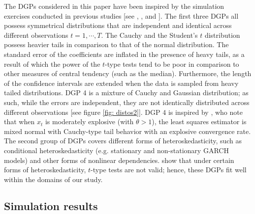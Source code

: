 \documentclass[harvard,11pt]{article}
\begin{document}
The DGPs considered in this paper have been inspired by the simulation exercises conducted in previous studies [see \citet{mankiw1986we}, \citet{dufour1995exact}, \citet{coudin2009finite} and \citet{dufour2010exact}]. The first three DGPs all possess symmetrical distributions that are independent and identical across different observations $t=1,\cdots,T$. The Cauchy and the Student's $t$ distribution possess heavier tails in comparison to that of the normal distribution. The standard error of the coefficients are inflated in the presence of heavy tails, as a result of which the power of the $t$-type tests tend to be poor in comparison to other measures of central tendency (such as the median). Furthermore, the length of the confidence intervals are extended when the data is sampled from heavy tailed distributions. DGP 4 is a mixture of Cauchy and Gaussian distribution; as such, while the errors are independent, they are not identically distributed across different observations [see figure \ref{fig: distos2}]. DGP 4 is inspired by \citet{magdalinos2009limit}, who note that when $x_t$ is moderately explosive (with $\theta>1$), the least squares estimator is mixed normal with Cauchy-type tail behavior with an explosive convergence rate. The second group of DGPs covers different forms of heteroskedasticity, such as conditional heteroskedasticity (e.g. stationary and non-stationary GARCH models) and other forms of nonlinear dependencies. \citet{dufour2010exact} show that under certain forms of heteroskedasticity, $t$-type tests are not valid; hence, these DGPs fit well within the domains of our study.  

\subsection{Simulation results \label{sec: Simulation results}}
\end{document}
